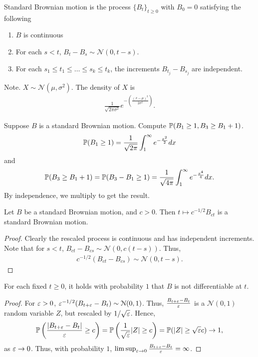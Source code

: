 \documentclass[11pt]{article}
\begin{document}
  \begin{definition} Standard Brownian motion is the process $\{ B_t \}_{t \ge 0}$ with $B_0 = 0$ satisfying the following \begin{enumerate}
    \item $B$ is continuous
    \item For each $s < t$, $B_t - B_s \sim \mathcal{N}(0, t - s)$.
      \item For each $s_1 \le t_1 \le \dots \le s_k \le t_k$, the increments $B_{t_j} - B_{s_j}$ are independent. 
  \end{enumerate}
\end{definition}

Note. $X \sim \mathcal{N}(\mu, \sigma^2)$. The density of $X$ is \begin{align*} \frac{1}{\sqrt{2\pi \sigma^2}} e^{- \left( \frac{(x - \mu)^2}{2 \sigma^2} \right)}.
\end{align*}

\begin{example} Suppose $B$ is a standard Brownian motion. Compute $\mathbb{P} (B_1 \ge 1, B_3 \ge B_1 + 1)$. \begin{align*} \mathbb{P} (B_1 \ge 1) = \frac{1}{\sqrt{2 \pi}} \int_1^{\infty} e^{- \frac{x^2}{2}} dx
\end{align*} and \begin{align*} \mathbb{P} (B_3 \ge B_1 + 1) = \mathbb{P} (B_3 - B_1 \ge 1) = \frac{1}{\sqrt{4 \pi}} \int_1^{\infty} e^{- \frac{x^4}{4}} dx.
\end{align*} By independence, we multiply to get the result.
\end{example}

\begin{proposition} Let $B$ be a standard Brownian motion, and $c > 0$. Then $t \mapsto c^{-1/2} B_{ct}$ is a standard Brownian motion. 
\end{proposition}
\begin{proof} Clearly the rescaled process is continuous and has independent increments. Note that for $s < t$, $B_{ct} - B_{cs} \sim \mathcal{N}(0, c(t - s))$. Thus, \begin{align*} c^{-1/2} (B_{ct} - B_{cs}) \sim \mathcal{N}(0, t - s).
\end{align*}
\end{proof}

\begin{proposition} For each fixed $t \ge 0$, it holds with probability $1$ that $B$ is not differentiable at $t$.
\end{proposition}
\begin{proof} For $\varepsilon > 0$, $\varepsilon^{- 1/2}(B_{t + \varepsilon} - B_t) \sim \mathcal{N}(0, 1)$. Thus, $\frac{B_{t + \varepsilon} - B_t}{\varepsilon}$ is a $\mathcal{N}(0, 1)$ random variable $Z$, but rescaled by $1/ \sqrt{\varepsilon}$. Hence, \begin{align*} \mathbb{P} \left(\frac{|B_{t + \varepsilon} - B_t|}{\varepsilon} \ge c \right) = \mathbb{P} \left( \frac{1}{\sqrt{\varepsilon}} |Z| \ge c \right) = \mathbb{P} (|Z| \ge \sqrt{\varepsilon} c ) \to 1,
\end{align*} as $\varepsilon \to 0$. Thus, with probability $1$, $\limsup_{\varepsilon \to 0} \frac{B_{t + \varepsilon} - B_t}{\varepsilon} = \infty$.
\end{proof}
\end{document}
